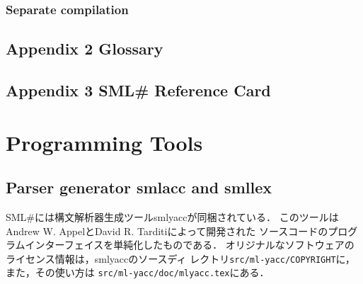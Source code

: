 \documentclass{jbook}
\newcommand{\txt}[2]{#2}
\newcommand{\smlsharp}{SML\#}
\newcommand{\code}[1]{\mbox{\large\tt #1}}
\begin{document}
\section{\txt{分割コンパイル}{Separate compilation}}
\ifjp%
\else%
\fi%

% 
\chapter{\txt{付録２ 用語集}{Appendix 2 Glossary }}
\ifjp%
\else%
\fi%

% 
\chapter{\txt{付録３ 参照シート}{Appendix 3 \smlsharp{} Reference Card}}
\ifjp%
\else%
\fi%

% 
% 
\part{\txt{プログラミングツール}{Programming Tools}}
\label{part:tools}

\ifjp%
\else%
\fi%


\chapter{\txt{構文解析器生成ツール smlyaccとsmllex}{Parser generator smlacc and smllex}}
\ifjp%
	\smlsharp{}には構文解析器生成ツールsmlyaccが同梱されている．
	このツールはAndrew W. AppelとDavid R. Tarditiによって開発された
ソースコードのプログラムインターフェイスを単純化したものである．
	オリジナルなソフトウェアのライセンス情報は，smlyaccのソースディ
レクトリ\code{src/ml-yacc/COPYRIGHT}に，また，その使い方は
\code{src/ml-yacc/doc/mlyacc.tex}にある．
\end{document}
